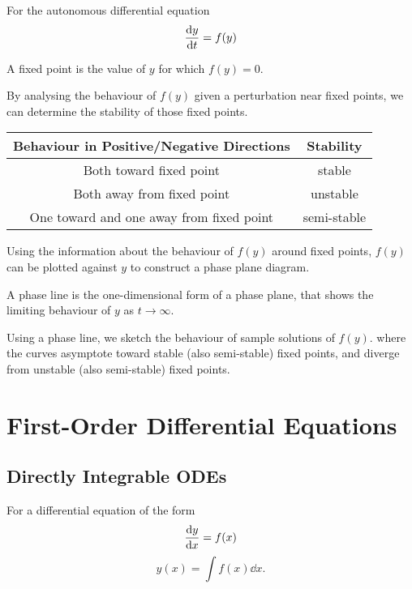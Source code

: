 \documentclass{article}
\begin{document}
For the autonomous differential equation
\begin{equation*}
    \dv{y}{t} = f(y)
\end{equation*}
\begin{definition}
    A fixed point is the value of \(y\) for which \(f(y) = 0\).
\end{definition}
\begin{definition}[Stability]
    By analysing the behaviour of \(f(y)\) given a perturbation near fixed points,
    we can determine the stability of those fixed points.
    \begin{table}[H]
        \centering
        \begin{tabular}{c c}
            \toprule
            \textbf{Behaviour in Positive/Negative Directions} & \textbf{Stability} \\
            \midrule
            Both toward fixed point                            & stable             \\
            Both away from fixed point                         & unstable           \\
            One toward and one away from fixed point           & semi-stable        \\
            \bottomrule
        \end{tabular}
    \end{table}
\end{definition}
\begin{definition}
    Using the information about the behaviour of \(f(y)\) around fixed points, \(f(y)\) can be plotted against \(y\)
    to construct a phase plane diagram.
\end{definition}
\begin{definition}
    A phase line is the one-dimensional form of a phase plane,
    that shows the limiting behaviour of \(y\) as \(t \to \infty\).
\end{definition}
\begin{definition}
    Using a phase line, we sketch the behaviour of sample solutions of \(f(y)\).
    where the curves asymptote toward stable
    (also semi-stable) fixed points, and diverge from unstable (also semi-stable) fixed points.
\end{definition}
\newpage
\section{First-Order Differential Equations}
\subsection{Directly Integrable ODEs}
For a differential equation of the form
\begin{equation*}
    \dv{y}{x} = f(x)
\end{equation*}
\begin{equation*}
    y(x) = \int f(x) \dd{x}.
\end{equation*}
\end{document}
